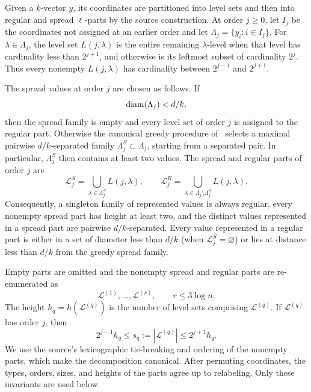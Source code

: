 Given a $k$-vector $y$, its coordinates are partitioned into level sets and then into regular and spread $\ell$-parts by the source construction. At order $j\ge0$, let $I_j$ be the coordinates not assigned at an earlier order and let $\Lambda_j=\{y_i:i\in I_j\}$. For $\lambda\in\Lambda_j$, the level set $L(j,\lambda)$ is the entire remaining $\lambda$-level when that level has cardinality less than $2^{j+1}$, and otherwise is its leftmost subset of cardinality $2^j$. Thus every nonempty $L(j,\lambda)$ has cardinality between $2^{j-1}$ and $2^{j+1}$.

The spread values at order $j$ are chosen as follows. If
\[
  \operatorname{diam}(\Lambda_j)<d/k,
\]
then the spread family is empty and every level set of order $j$ is assigned to the regular part. Otherwise the canonical greedy procedure of~\cite[Section~5.2]{LLTTY19} selects a maximal pairwise $d/k$-separated family $\Lambda_j^S\subset\Lambda_j$, starting from a separated pair. In particular, $\Lambda_j^S$ then contains at least two values. The spread and regular parts of order $j$ are
\[
  \mathcal L_j^S=\bigcup_{\lambda\in\Lambda_j^S}L(j,\lambda),
  \qquad
  \mathcal L_j^R=\bigcup_{\lambda\in\Lambda_j\setminus\Lambda_j^S}L(j,\lambda).
\]
Consequently, a singleton family of represented values is always regular, every nonempty spread part has height at least two, and the distinct values represented in a spread part are pairwise $d/k$-separated. Every value represented in a regular part is either in a set of diameter less than $d/k$ (when $\mathcal L_j^S=\varnothing$) or lies at distance less than $d/k$ from the greedy spread family.

Empty parts are omitted and the nonempty spread and regular parts are re-enumerated as
\[
  \mathcal L^{(1)},\ldots,\mathcal L^{(r)},
  \qquad r\le3\log n.
\]
The height $h_q=h(\mathcal L^{(q)})$ is the number of level sets comprising $\mathcal L^{(q)}$. If $\mathcal L^{(q)}$ has order $j$, then
\begin{equation}\label{eq:part-size-height}
  2^{j-1}h_q\le s_q:=|\mathcal L^{(q)}|\le2^{j+1}h_q.
\end{equation}
We use the source's lexicographic tie-breaking and ordering of the nonempty parts, which make the decomposition canonical. After permuting coordinates, the types, orders, sizes, and heights of the parts agree up to relabeling. Only these invariants are used below.

